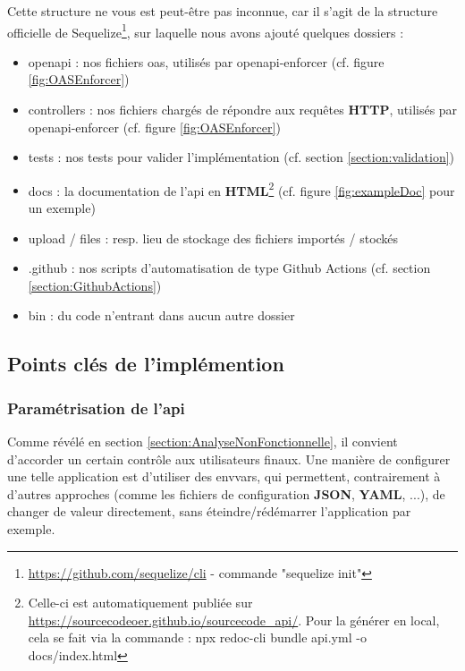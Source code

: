 Cette structure ne vous est peut-être pas inconnue, car il s'agit de la structure officielle de Sequelize\footnote{
    \url{https://github.com/sequelize/cli} - commande "sequelize init"
}, sur laquelle nous avons ajouté quelques dossiers :

\begin{itemize}
    \item openapi : nos fichiers \Gls{oas}, utilisés par openapi-enforcer (cf. figure \ref{fig:OASEnforcer})
    \item controllers : nos fichiers chargés de répondre aux requêtes \textbf{HTTP}, utilisés par openapi-enforcer (cf. figure \ref{fig:OASEnforcer})
    \item tests : nos tests pour valider l'implémentation (cf. section \ref{section:validation})
    \item docs : la documentation de l'\Gls{api} en \textbf{HTML}\footnote{
        Celle-ci est automatiquement publiée sur 
        \href{https://sourcecodeoer.github.io/sourcecode\_api/}{https://sourcecodeoer.github.io/sourcecode\_api/}.
        Pour la générer en local, cela se fait via la commande : 
        npx redoc-cli bundle api.yml -o docs/index.html 
    } (cf. figure \ref{fig:exampleDoc} pour un exemple)
    \item upload / files : resp. lieu de stockage des fichiers importés / stockés 
    \item .github : nos scripts d'automatisation de type Github Actions (cf. section \ref{section:GithubActions}) 
    \item bin : du code n'entrant dans aucun autre dossier
\end{itemize}

\pagebreak
\subsection{Points clés de l'implémention}

\subsubsection{Paramétrisation de l'\Gls{api}}

Comme révélé en section \ref{section:AnalyseNonFonctionnelle}, il convient d'accorder un certain contrôle aux utilisateurs finaux.
Une manière de configurer une telle application est d'utiliser des \glspl{envvar}, 
qui permettent, contrairement à d'autres approches (comme les fichiers de configuration \textbf{JSON}, \textbf{YAML}, ...), 
de changer de valeur directement, sans éteindre/rédémarrer l'application par exemple. \\

